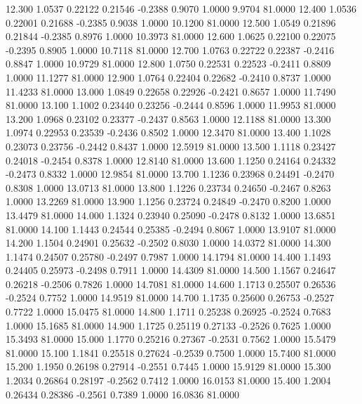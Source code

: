   12.300   1.0537   0.22122   0.21546  -0.2388   0.9070   1.0000   9.9704  81.0000
  12.400   1.0536   0.22001   0.21688  -0.2385   0.9038   1.0000  10.1200  81.0000
  12.500   1.0549   0.21896   0.21844  -0.2385   0.8976   1.0000  10.3973  81.0000
  12.600   1.0625   0.22100   0.22075  -0.2395   0.8905   1.0000  10.7118  81.0000
  12.700   1.0763   0.22722   0.22387  -0.2416   0.8847   1.0000  10.9729  81.0000
  12.800   1.0750   0.22531   0.22523  -0.2411   0.8809   1.0000  11.1277  81.0000
  12.900   1.0764   0.22404   0.22682  -0.2410   0.8737   1.0000  11.4233  81.0000
  13.000   1.0849   0.22658   0.22926  -0.2421   0.8657   1.0000  11.7490  81.0000
  13.100   1.1002   0.23440   0.23256  -0.2444   0.8596   1.0000  11.9953  81.0000
  13.200   1.0968   0.23102   0.23377  -0.2437   0.8563   1.0000  12.1188  81.0000
  13.300   1.0974   0.22953   0.23539  -0.2436   0.8502   1.0000  12.3470  81.0000
  13.400   1.1028   0.23073   0.23756  -0.2442   0.8437   1.0000  12.5919  81.0000
  13.500   1.1118   0.23427   0.24018  -0.2454   0.8378   1.0000  12.8140  81.0000
  13.600   1.1250   0.24164   0.24332  -0.2473   0.8332   1.0000  12.9854  81.0000
  13.700   1.1236   0.23968   0.24491  -0.2470   0.8308   1.0000  13.0713  81.0000
  13.800   1.1226   0.23734   0.24650  -0.2467   0.8263   1.0000  13.2269  81.0000
  13.900   1.1256   0.23724   0.24849  -0.2470   0.8200   1.0000  13.4479  81.0000
  14.000   1.1324   0.23940   0.25090  -0.2478   0.8132   1.0000  13.6851  81.0000
  14.100   1.1443   0.24544   0.25385  -0.2494   0.8067   1.0000  13.9107  81.0000
  14.200   1.1504   0.24901   0.25632  -0.2502   0.8030   1.0000  14.0372  81.0000
  14.300   1.1474   0.24507   0.25780  -0.2497   0.7987   1.0000  14.1794  81.0000
  14.400   1.1493   0.24405   0.25973  -0.2498   0.7911   1.0000  14.4309  81.0000
  14.500   1.1567   0.24647   0.26218  -0.2506   0.7826   1.0000  14.7081  81.0000
  14.600   1.1713   0.25507   0.26536  -0.2524   0.7752   1.0000  14.9519  81.0000
  14.700   1.1735   0.25600   0.26753  -0.2527   0.7722   1.0000  15.0475  81.0000
  14.800   1.1711   0.25238   0.26925  -0.2524   0.7683   1.0000  15.1685  81.0000
  14.900   1.1725   0.25119   0.27133  -0.2526   0.7625   1.0000  15.3493  81.0000
  15.000   1.1770   0.25216   0.27367  -0.2531   0.7562   1.0000  15.5479  81.0000
  15.100   1.1841   0.25518   0.27624  -0.2539   0.7500   1.0000  15.7400  81.0000
  15.200   1.1950   0.26198   0.27914  -0.2551   0.7445   1.0000  15.9129  81.0000
  15.300   1.2034   0.26864   0.28197  -0.2562   0.7412   1.0000  16.0153  81.0000
  15.400   1.2004   0.26434   0.28386  -0.2561   0.7389   1.0000  16.0836  81.0000
